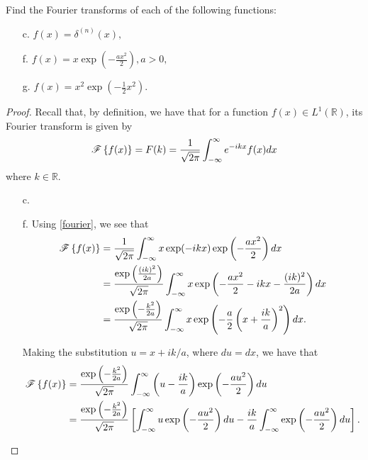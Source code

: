 \begin{problem}{2.1}
  Find the Fourier transforms of each of the following functions:
  \begin{enumerate}
    \item [c.] $f(x) = \delta ^{(n)}(x),$
    \item [f.] $\displaystyle f(x) = x \exp \left( -\frac{a x^2}{2} \right), a > 0,$
    \item [g.] $\displaystyle f(x) = x^2 \exp \left( -\frac{1}{2}x^2 \right).$
  \end{enumerate}
\end{problem}

\begin{proof}
  Recall that, by definition, we have that for a function $f(x) \in L^1(\mathbb{R})$,
  its Fourier transform is given by
  \begin{align}\label{fourier}
    \mathscr{F}\left\{ {f(x)} \right\} = F(k) = \frac{1}{\sqrt{2 \pi}} \int_{-\infty}^{\infty} e^{-ikx}f(x) dx
  \end{align}
  where $k\in\mathbb{R}$.

  \begin{enumerate}
    \item [c.]
    \item [f.] Using \eqref{fourier}, we see that
      \begin{align*}
        \mathscr{F}\left\{ {f(x)} \right\} &= \frac{1}{\sqrt{2 \pi}} \int_{-\infty}^{\infty} x \exp(-ikx) \exp\left(-\frac{ax^2}{2}\right) dx \\
        &= \frac{\exp\left( \frac{(ik)^2}{2a} \right)}{\sqrt{2 \pi}} \int_{-\infty}^{\infty} x \exp\left(-\frac{ax^2}{2} - ikx - \frac{(ik)^2}{2a}\right)  dx \\
        &= \frac{\exp\left( -\frac{k^2}{2a} \right)}{\sqrt{2 \pi}} \int_{-\infty}^{\infty} x \exp\left(-\frac{a}{2} \left(x + \frac{ik}{a}\right)^2 \right)  dx.
      \end{align*}

      Making the substitution $u = x + ik/a$, where $du = dx$, we have that
      \begin{align}\label{subst}
        \mathscr{F}\left\{ {f(x)} \right\} &= \frac{\exp\left( -\frac{k^2}{2a} \right)}{\sqrt{2 \pi}} \int_{-\infty}^{\infty} \left(u - \frac{ik}{a}\right) \exp\left(-\frac{au^2}{2}  \right)  du \notag \\
        &= \frac{\exp\left( -\frac{k^2}{2a} \right)}{\sqrt{2 \pi}} \left[\int_{-\infty}^{\infty} u\exp\left(-\frac{au^2}{2}  \right) du - \frac{ik}{a}\int_{-\infty}^{\infty} \exp\left(-\frac{au^2}{2}  \right)du\right].
      \end{align}


\end{enumerate}
\end{proof}
